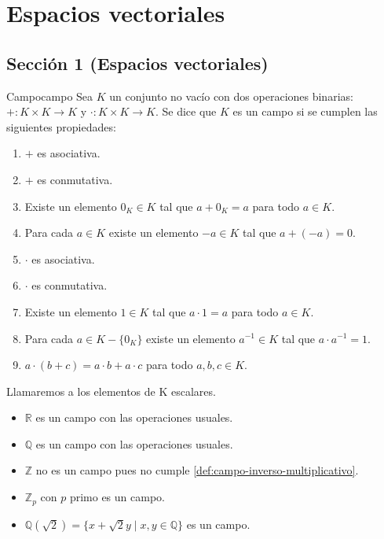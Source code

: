 \chapter{Espacios vectoriales}

\section{Sección 1 (Espacios vectoriales)}
\begin{definition}{Campo}{campo} 
    Sea $K$ un conjunto no vacío con dos operaciones binarias:\\ $+:K\times K\rightarrow K$ y $\cdot:K\times K\rightarrow K$. Se dice que $K$ es un campo si se cumplen las siguientes propiedades:
    \begin{enumerate}
        \item $+$ es asociativa. \label{def:campo-asociativa-aditiva}
        \item $+$ es conmutativa. \label{def:campo-conmutativa-aditiva}
        \item Existe un elemento $0_K\in K$ tal que $a+0_K=a$ para todo $a\in K$. \label{def:campo-neutro-aditivo}
        \item Para cada $a\in K$ existe un elemento $-a\in K$ tal que $a+(-a)=0$. \label{def:campo-inverso-aditivo}
        \item $\cdot$ es asociativa. \label{def:campo-asociativa-multiplicativa}
        \item $\cdot$ es conmutativa. \label{def:campo-conmutativa-multiplicativa}
        \item Existe un elemento $1\in K$ tal que $a\cdot 1=a$ para todo $a\in K$. \label{def:campo-neutro-multiplicativo}
        \item Para cada $a\in K - \{0_K\}$ existe un elemento $a^{-1}\in K$ tal que $a\cdot a^{-1}=1$. \label{def:campo-inverso-multiplicativo}
        \item $a \cdot (b+c)=a\cdot b + a\cdot c$ para todo $a,b,c\in K$. \label{def:campo-distributiva-izquierda}
    \end{enumerate}
    Llamaremos a los elementos de K escalares.
\end{definition}


\begin{example}{}{}
\begin{itemize}
    \item $\mathbb{R}$ es un campo con las operaciones usuales.
    \item $\mathbb{Q}$ es un campo con las operaciones usuales.
    \item $\mathbb{Z}$ no es un campo pues no cumple \ref{def:campo-inverso-multiplicativo}.
    \item $\mathbb{Z}_p$ con $p$ primo es un campo.
    \item $\mathbb{Q}(\sqrt{2}) = \{x + \sqrt{2}y \mid x,y \in \mathbb{Q}\}$ es un campo.
    

\end{itemize}

\end{example}

